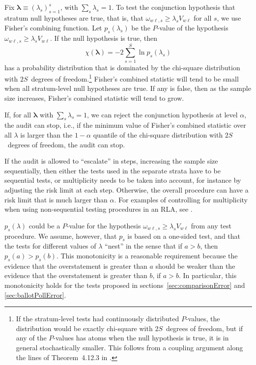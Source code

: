\documentclass[runningheads]{llncs}
\newcommand{\beq}{\begin{equation}}
\newcommand{\eeq}{\end{equation}}
\begin{document}
Fix $\mathbf{\lambda} \equiv (\lambda_s)_{s=1}^s$, with $\sum_s \lambda_s = 1$.
To test the conjunction hypothesis that stratum null hypotheses are true, that is, that $\omega_{w\ell,s} \ge \lambda_s V_{w\ell}$ for all $s$, we use Fisher's combining function.
Let $p_s(\lambda_s)$ be the $P$-value of the hypothesis $\omega_{w\ell,s} \ge \lambda_s V_{w\ell}$.
If the null hypothesis is true, then 
\beq \label{eq:fisher}
   \chi(\mathbf{\lambda}) = -2 \sum_{s=1}^S \ln p_s(\lambda_s)
\eeq
has a probability distribution that is dominated by the chi-square distribution with $2S$~degrees
of freedom.\footnote{%
   If the stratum-level tests had continuously distributed $P$-values, the distribution would be exactly
   chi-square with $2S$~degrees of freedom, but if any of the $P$-values has atoms when
   the null hypothesis is true, it is in general stochastically smaller.
   This follows from a coupling argument along the lines of Theorem~4.12.3 in \cite{grimmett01}.
}
Fisher's combined statistic will tend to be small when all stratum-level null hypotheses are true.
If any is false, then as the sample size increases, Fisher's combined statistic will tend to grow.

If, for all $\mathbf{\lambda}$ with $\sum_s \lambda_s = 1$, we can reject the conjunction
hypothesis at level $\alpha$, the audit can stop, i.e., if the minimum value of Fisher's combined statistic over all $\lambda$ is larger than the $1-\alpha$ quantile of the chi-square
distribution with $2S$~degrees of freedom, the audit can stop. 

If the audit is allowed to ``escalate'' in steps, increasing the sample size sequentially, then either the tests used in the separate strata have to be sequential tests, or multiplicity needs to be taken into account, for instance by adjusting the risk limit at each step.
Otherwise, the overall procedure can have a risk limit that is much larger than $\alpha$.
For examples of controlling for multiplicity when using non-sequential testing procedures in an RLA, see \cite{stark08a,stark09a}.

$p_s(\lambda)$ could be a $P$-value for the hypothesis
$\omega_{w\ell,s} \ge \lambda_s V_{w\ell}$ from any test procedure. 
We assume, however, that $p_s$ is based on a one-sided test, and that the tests
for different values of $\lambda$ ``nest'' in the sense that if $a > b$,
then $p_s(a) > p_s(b)$.
This monotonicity is a reasonable requirement because the evidence that the overstatement
is greater than $a$ should be weaker than the evidence that the overstatement is greater than
$b$, if $a > b$.
In particular, this monotonicity holds for the tests proposed in sections~\ref{sec:comparisonError}
and \ref{sec:ballotPollError}.
\end{document}
